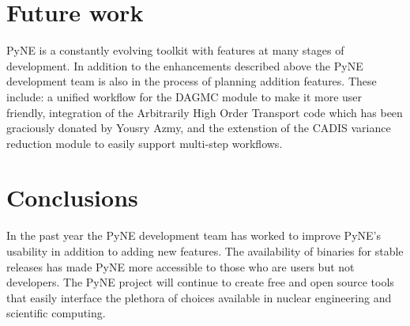 \documentclass{anstrans}
\begin{document}
\section{Future work}

PyNE is a constantly evolving toolkit with features at many stages of 
development. In addition to the enhancements described above the PyNE
development team is also in the process of planning addition features.
These include: a unified workflow for the DAGMC module to make it more user
friendly, integration of the Arbitrarily High Order Transport code which has
been graciously donated by Yousry Azmy, and the extenstion of the CADIS
variance reduction module to easily support multi-step workflows. 

\section{Conclusions}

In the past year the PyNE development team has worked to improve PyNE's 
usability in addition to adding new features. The availability of binaries 
for stable releases has made PyNE more accessible to those who are users 
but not developers. The PyNE project will continue to create free and open 
source tools that easily interface the plethora of choices available in 
nuclear engineering and scientific computing. 

 
 
\end{document}
